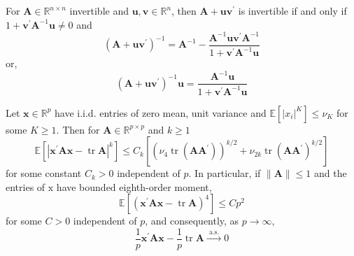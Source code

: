 \begin{lemma} \label{lem:sherman-morrison}
    For $\mathbf{A}\in\mathbb{R}^{n\times n}$ invertible and $\mathbf{u},\mathbf{v}\in\mathbb{R}^{n}$, then $\mathbf{A}+\mathbf{u}\mathbf{v}^{\prime}$ is invertible if and only if $1+\mathbf{v}^{\prime}\mathbf{A}^{-1}\mathbf{u}\neq 0$ and
    \begin{equation}
        \left(\mathbf{A}+\mathbf{u}\mathbf{v}^{\prime}\right)^{-1}=\mathbf{A}^{-1}-\frac{\mathbf{A}^{-1}\mathbf{u}\mathbf{v}^{\prime}\mathbf{A}^{-1}}{1+\mathbf{v}^{\prime}\mathbf{A}^{-1}\mathbf{u}}
    \end{equation}
    or,
    \begin{equation}
        \left(\mathbf{A}+\mathbf{u}\mathbf{v}^{\prime}\right)^{-1}\mathbf{u}=\frac{\mathbf{A}^{-1}\mathbf{u}}{1+\mathbf{v}^{\prime}\mathbf{A}^{-1}\mathbf{u}}
    \end{equation}
\end{lemma}

\begin{lemma} \label{lem:quadratic-form-close-to-the-trace}
    Let $\mathbf{x} \in \mathbb{R}^{p}$ have i.i.d. entries of zero mean, unit variance and $\mathbb{E}\left[\left|x_{i}\right|^{K}\right] \leq \nu_{K}$ for some $K \geq 1 .$ Then for $\mathbf{A} \in \mathbb{R}^{p \times p}$ and $k \geq 1$
    $$
        \mathbb{E}\left[\left|\mathbf{x}^{\prime} \mathbf{A} \mathbf{x}-\operatorname{tr} \mathbf{A}\right|^{k}\right] \leq C_{k}\left[\left(\nu_{4} \operatorname{tr}\left(\mathbf{A} \mathbf{A}^{\prime}\right)\right)^{k / 2}+\nu_{2 k} \operatorname{tr}\left(\mathbf{A} \mathbf{A}^{\prime}\right)^{k / 2}\right]
    $$
    for some constant $C_{k}>0$ independent of $p .$ In particular, if $\|\mathbf{A}\| \leq 1$ and the entries of $\mathrm{x}$ have bounded eighth-order moment,
    $$
        \mathbb{E}\left[\left(\mathbf{x}^{\prime} \mathbf{A} \mathbf{x}-\operatorname{tr} \mathbf{A}\right)^{4}\right] \leq C p^{2}
    $$
    for some $C>0$ independent of $p$, and consequently, as $p \rightarrow \infty$,
    $$
        \frac{1}{p} \mathbf{x}^{\prime} \mathbf{A} \mathbf{x}-\frac{1}{p} \operatorname{tr} \mathbf{A} \stackrel{\text { a.s. }}{\longrightarrow} 0
    $$
\end{lemma}

